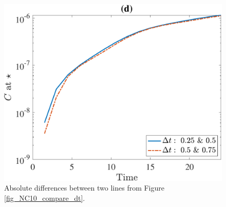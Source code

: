 \begin{figure}[h]
\begin{center}
		\includegraphics[scale=0.2]{./figures/fig_NC10_dt_diff_C_star}
	\caption{Absolute differences between two lines from Figure \ref{fig_NC10_compare_dt}. }
	\label{fig_NC10_dt_diff_all}
\end{center}
\end{figure}

